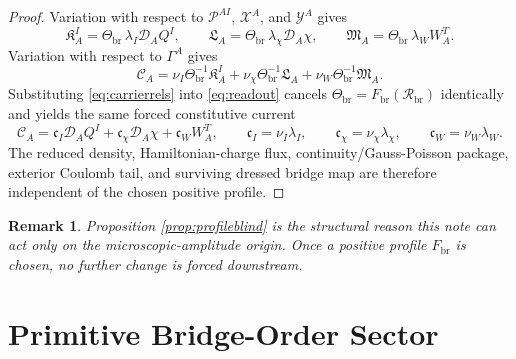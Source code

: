 \documentclass[11pt]{article}
\newcommand{\SpatialD}{\mathcal D}
\newcommand{\ConstCurrent}{\mathcal C}
\newcommand{\ConstGamma}{\Gamma}
\newcommand{\CurvQMult}{\mathscr P}
\newcommand{\CurvChiMult}{\mathscr X}
\newcommand{\CurvTransMult}{\mathscr Y}
\newcommand{\CurvSeed}{\Theta_{\mathrm{br}}}
\newcommand{\CurvProfile}{F_{\mathrm{br}}}
\newcommand{\CurvOneI}{\mathfrak K}
\newcommand{\CurvOneChi}{\mathfrak L}
\newcommand{\CurvOneW}{\mathfrak M}
\newcommand{\BridgeCurv}{\mathcal R_{\mathrm{br}}}
\newtheorem{remark}{Remark}
\begin{document}
\begin{proof}
Variation with respect to \(\CurvQMult^{AI}\), \(\CurvChiMult^A\), and \(\CurvTransMult^A\) gives
\begin{equation}
\CurvOneI_A^I=\CurvSeed\,\lambda_I\SpatialD_AQ^I,
\qquad
\CurvOneChi_A=\CurvSeed\,\lambda_\chi\SpatialD_A\chi,
\qquad
\CurvOneW_A=\CurvSeed\,\lambda_WW_A^T.
\label{eq:carrierrels}
\end{equation}
Variation with respect to \(\ConstGamma^A\) gives
\begin{equation}
\ConstCurrent_A
=
\nu_I\CurvSeed^{-1}\CurvOneI_A^I
+\nu_\chi\CurvSeed^{-1}\CurvOneChi_A
+\nu_W\CurvSeed^{-1}\CurvOneW_A.
\label{eq:readout}
\end{equation}
Substituting \eqref{eq:carrierrels} into \eqref{eq:readout} cancels \(\CurvSeed=\CurvProfile(\BridgeCurv)\) identically and yields the same forced constitutive current
\begin{equation}
\ConstCurrent_A
=
\mathfrak c_I\SpatialD_AQ^I
+\mathfrak c_\chi\SpatialD_A\chi
+\mathfrak c_WW_A^T,
\qquad
\mathfrak c_I=\nu_I\lambda_I,
\qquad
\mathfrak c_\chi=\nu_\chi\lambda_\chi,
\qquad
\mathfrak c_W=\nu_W\lambda_W.
\label{eq:forcedcurrent}
\end{equation}
The reduced density, Hamiltonian-charge flux, continuity/Gauss-Poisson package, exterior Coulomb tail, and surviving dressed bridge map are therefore independent of the chosen positive profile.
\end{proof}

\begin{remark}
Proposition \ref{prop:profileblind} is the structural reason this note can act only on the microscopic-amplitude origin. Once a positive profile \(\CurvProfile\) is chosen, no further change is forced downstream.
\end{remark}

\section{Primitive Bridge-Order Sector}
\end{document}
